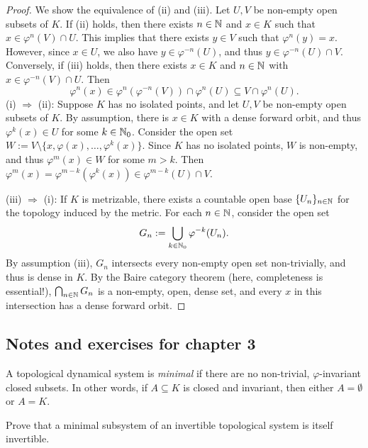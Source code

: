 \begin{proof}
	We show the equivalence of (ii) and (iii). Let $U,V$ be non-empty open subsets of $K$. If (ii) holds, then there exists $n\in\mathbb{N}$ and $x\in K$ such that $x\in \varphi^n(V)\cap U$. This implies that there exists $y\in V$ such that $\varphi^n(y)=x$. However, since $x\in U$, we also have $y\in \varphi^{-n}(U)$, and thus $y\in\varphi^{-n}(U)\cap V$. Conversely, if (iii) holds, then there exists $x\in K$ and $n\in\mathbb{N}$ with $x\in\varphi^{-n}(V)\cap U$. Then
	\begin{equation*}
		\varphi^n(x) \in \varphi^n(\varphi^{-n}(V)) \cap \varphi^n(U) \subseteq V\cap \varphi^n(U).
	\end{equation*}
	(i) $\Rightarrow$ (ii): Suppose $K$ has no isolated points, and let $U,V$ be non-empty open subsets of $K$. By assumption, there is $x\in K$ with a dense forward orbit, and thus $\varphi^k(x)\in U$ for some $k\in\mathbb{N}_0$. Consider the open set $W:= V\setminus\{x, \varphi(x),\ldots,\varphi^k(x)\}$. Since $K$ has no isolated points, $W$ is non-empty, and thus $\varphi^m(x)\in W$ for some $m>k$. Then $\varphi^m(x)=\varphi^{m-k}(\varphi^k(x))\in \varphi^{m-k}(U)\cap V$.
	
	(iii) $\Rightarrow$ (i): If $K$ is metrizable, there exists a countable open base $\{U_n\}_{n\in\mathbb{N}}$ for the topology induced by the metric. For each $n\in\mathbb{N}$, consider the open set
	\begin{equation*}
		G_n := \bigcup_{k\in\mathbb{N}_0} \varphi^{-k}(U_n).
	\end{equation*}
	By assumption (iii), $G_n$ intersects every non-empty open set non-trivially, and thus is dense in $K$. By the Baire category theorem (here, completeness is essential!), $\bigcap_{n\in\mathbb{N}}G_n$ is a non-empty, open, dense set, and every $x$ in this intersection has a dense forward orbit.
\end{proof}

\subsection{Notes and exercises for chapter 3}

A topological dynamical system is \emph{minimal} if there are no non-trivial, $\varphi$-invariant closed subsets. In other words, if $A \subseteq K$ is closed and invariant, then either $A=\emptyset$ or $A=K$.

\begin{exercise}[Exercise 3.1]
	Prove that a minimal subsystem of an invertible topological system is itself invertible.
\end{exercise}

